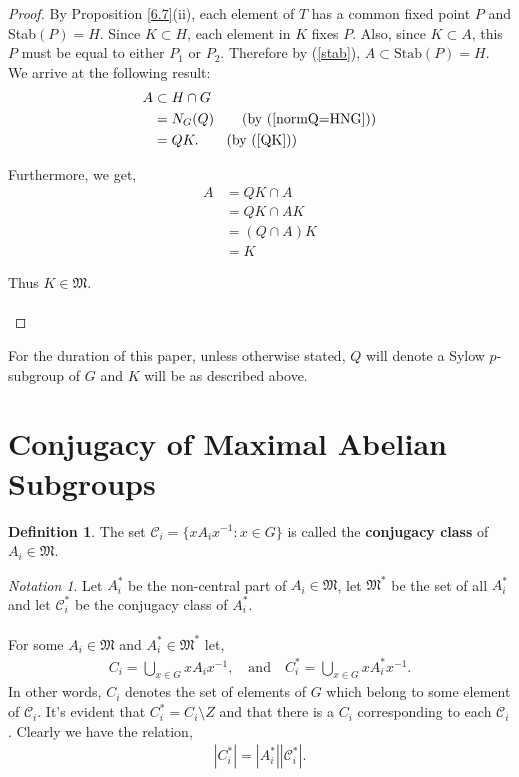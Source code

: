 \documentclass[a4paper , 11pt]{book}
\theoremstyle{definition}
\newtheorem*{definition-non}{Definition}
\theoremstyle{remark}
\newtheorem*{notation-non}{Notation}
\begin{document}
\begin{proof}
By Proposition \ref{6.7}(ii), each element of $T$ has a common fixed point $P$ and Stab$(P) = H$. Since $K \subset H$, each element in $K$ fixes $P$. Also, since $K \subset A$, this $P$ must be equal to either $P_1$ or $P_2$. Therefore by (\ref{stab}), $A \subset \text{Stab}(P) = H$. We arrive at the following result:
\begin{align*} A &\subset H \cap G 
\\ &= N_G(Q) \tag{by (\ref{normQ=HNG})}
\\ &= QK. \tag{by (\ref{QK})}
\end {align*}

Furthermore, we get,
\begin{align*} A &= QK \cap A
\\ &= QK \cap AK \tag{$K \subset A$ so $A = AK$}
\\ &= (Q \cap A)K
\\ &= K \tag{$Q \cap A = I_G$}
\end{align*}

Thus $K \in \mathfrak{M}$. \\
\\
\end{proof}

For the duration of this paper, unless otherwise stated, $Q$ will denote a Sylow $p$-subgroup of $G$ and $K$ will be as described above. 

\section{Conjugacy of Maximal Abelian Subgroups}

\begin{definition-non} The set $\mathcal{C}_i = \{ x A_i x^{-1} : x \in G \}$ is called the \textbf{conjugacy class} of $A_i \in \mathfrak{M}$.
\end{definition-non}

\begin{notation-non} Let $A_i^*$ be the non-central part of $A_i \in \mathfrak{M}$, let $\mathfrak{M}^*$ be the set of all $A_i^*$ and let $\mathcal{C}_i^*$ be the conjugacy class of $A_i^*$. \\
\\
For some $A_i \in \mathfrak{M}$ and $A_i^* \in \mathfrak{M}^*$ let,
\begin{align*} C_i = \bigcup\limits_{x \in G} x A_i x^{-1}, \quad \text{and} \quad  C_i^* = \bigcup\limits_{x \in G} x A_i^* x^{-1}.
\end{align*}
In other words, $C_i$ denotes the set of elements of $G$ which belong to some element of $\mathcal{C}_i$. It's evident that $C_i^* = C_i \setminus Z$ and that there is a $C_i$ corresponding to each $\mathcal{C}_i$. Clearly we have the relation,
\begin{align}\label{orderorder} |C_i^*| = |A_i^*||\mathcal{C}_i^*|.
\end{align}
\end{notation-non}
\end{document}
